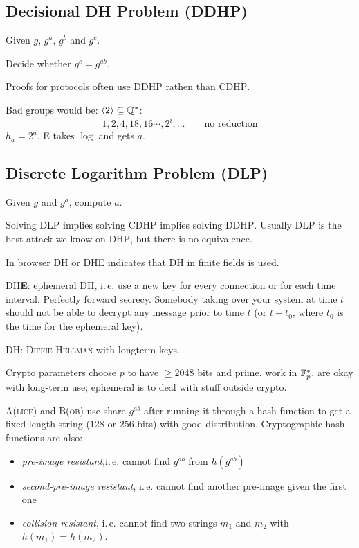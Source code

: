 \subsection{Decisional DH Problem (DDHP)}

Given $g$, $g^a$, $g^b$ and $g^c$.

Decide whether $g^c = g^{ab}$.

Proofs for protocols often use \textsc{DDHP} rathen than \textsc{CDHP}.

Bad groups would be: $\langle 2 \rangle \subseteq \mathbb{Q}^{\ast}$:
\[
1,2,4,18,16 \cdots, 2^i, \dots  \qquad \text{no reduction}
\]
$h_a=2^a$, \textsc{E} takes $\log$ and gets $a$.

\subsection{Discrete Logarithm Problem (DLP)}

Given $g$ and $g^a$, compute $a$.

Solving \textsc{DLP} implies solving \textsc{CDHP} implies solving \textsc{DDHP}. Usually \textsc{DLP} is the best attack we know on \textsc{DHP}, but there is no equivalence.

In browser \textsc{DH} or \textsc{DHE} indicates that \textsc{DH} in finite fields is used. 

\textsc{DH\textbf{E}}: ephemeral \textsc{DH}, i.\,e. use a new key for every connection or for each time interval.
Perfectly forward secrecy. Somebody taking over your system at time $t$ should not be able to decrypt any message prior to time $t$ (or $t-t_0$, where $t_0$ is the time for the ephemeral key).

\textsc{DH}: \textsc{Diffie-Hellman} with longterm keys.

Crypto parameters choose $p$ to have $\geq 2048$ bits and prime, work in $\mathbb{F}_p^{\ast}$, are okay with long-term use; ephemeral is to deal with stuff outside crypto.

\textsc{A(lice)} and \textsc{B(ob)} use share $g^{ab}$ after running it through a hash function to get a fixed-length string ($128$ or $256$ bits) with good distribution. Cryptographic hash functions are also:

\begin{itemize}
\item \emph{pre-image resistant},i.\,e. cannot find $g^{ab}$ from $h(g^{ab})$
\item \emph{second-pre-image resistant}, i.\,e. cannot find another pre-image given the first one
\item \emph{collision resistant}, i.\,e. cannot find two strings $m_1$ and $m_2$ with $h(m_1) = h(m_2)$.
\end{itemize}

